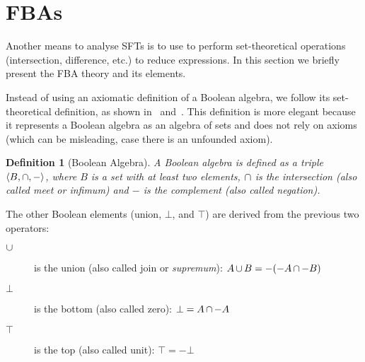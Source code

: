 \documentclass[12pt,openright,twoside,a4paper,oldfontcommands,english,brazil,draft]{abntex2}
\newtheorem{Def}{Definition}[chapter]
\theoremstyle{theo}
\newcommand{\anglesin}[1]{\ensuremath\left\langle #1 \right\rangle}
\def\union{\ensuremath\operatorname{\cup}}
\def\inter{\ensuremath\operatorname{\cap}}
\begin{document}
\section[Free Boolean Algebras]{\Aclp*{FBA}}
\label{sec:fba}

Another means to analyse \acp{SFT} is to use  to perform set-theoretical operations (intersection, difference, etc.) to reduce expressions.
In this section we briefly present the \ac{FBA} theory and its elements.

Instead of using an axiomatic definition of a Boolean algebra, we follow its set-theoretical definition, as shown in~\cite[pp. 254--258]{Stoll1979} and~\cite[pp. 8--11]{GH2009}.
This definition is more elegant because it represents a Boolean algebra as an algebra of sets and does not rely on axioms (which can be misleading, case there is an unfounded axiom).

\begin{Def}[Boolean Algebra]
\label{def:boolean-algebra}
A Boolean algebra is defined as a triple $\anglesin{B, \inter, -}$, where $B$ is a set with at least two elements, $\inter$ is the intersection (also called meet or \emph{infimum}) and $-$ is the complement (also called negation).
\end{Def}
%
\noindent The other Boolean elements (union, $\bot$, and $\top$) are derived from the previous two operators:
\begin{description}
  \item[$\union$] is the union (also called join or \emph{supremum}): $A \union B = -(-A \inter -B)$
  \item [$\bot$] is the bottom (also called zero): $\bot = A \inter -A$
  \item [$\top$] is the top (also called unit): $\top = -\bot$
\end{description}
\end{document}
